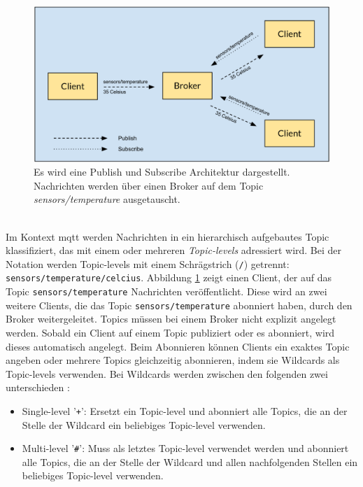 \begin{figure}[h]
    \centering
    \includegraphics[scale=0.33]{images/publish_subscribe.png}
    \caption{Es wird eine Publish und Subscribe Architektur dargestellt. Nachrichten werden über einen Broker auf dem Topic \textit{sensors/temperature} ausgetauscht.}
    \label{fig:publish-subscribe}
\end{figure}
\\
Im Kontext \ac{mqtt} werden Nachrichten in ein hierarchisch aufgebautes Topic klassifiziert, das mit einem oder mehreren \textit{Topic-levels} adressiert wird.
Bei der Notation werden Topic-levels mit einem Schrägstrich (\verb|/|) getrennt: \verb|sensors/temperature/celcius|.
Abbildung \ref{fig:publish-subscribe} zeigt einen Client, der auf das Topic \verb|sensors/temperature| Nachrichten veröffentlicht. Diese wird an zwei weitere Clients, die das Topic \verb|sensors/temperature| abonniert haben, durch den Broker weitergeleitet.
Topics müssen bei einem Broker nicht explizit angelegt werden. Sobald ein Client auf einem Topic publiziert oder es abonniert, wird dieses automatisch angelegt.\cite{WhatMQTTDefinition}
\newpage
\noindent Beim Abonnieren können Clients ein exaktes Topic angeben oder mehrere Topics gleichzeitig abonnieren, indem sie Wildcards als Topic-levels verwenden.
Bei Wildcards werden zwischen den folgenden zwei unterschieden \cite{teamMQTTTopicsBest}:
\begin{itemize}
    \item Single-level '\verb|+|': Ersetzt ein Topic-level und abonniert alle Topics, die an der Stelle der Wildcard ein beliebiges Topic-level verwenden.
    \item Multi-level '\verb|#|': Muss als letztes Topic-level verwendet werden und abonniert alle Topics, die an der Stelle der Wildcard und allen nachfolgenden Stellen ein beliebiges Topic-level verwenden.
\end{itemize}
